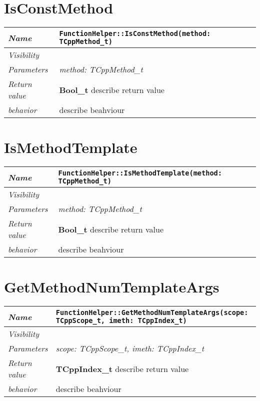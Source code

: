  \section{IsConstMethod}
\begin{longtable}{p{3cm} @{\hskip 1cm} p{12cm}}
 \hline
\textit{Name} & \texttt{FunctionHelper::IsConstMethod(method: TCppMethod_t)}\\
\hline
 \textit{Visibility} & \\
\hline
\textit{Parameters} & \textit{method: TCppMethod_t}\\
\hline
\textit{Return value} & \textbf{ Bool_t} describe return value\\
  \hline
 \textit{behavior} & describe beahviour \\
\hline
\end{longtable} \pagebreak
 \section{IsMethodTemplate}
\begin{longtable}{p{3cm} @{\hskip 1cm} p{12cm}}
 \hline
\textit{Name} & \texttt{FunctionHelper::IsMethodTemplate(method: TCppMethod_t)}\\
\hline
 \textit{Visibility} & \\
\hline
\textit{Parameters} & \textit{method: TCppMethod_t}\\
\hline
\textit{Return value} & \textbf{ Bool_t} describe return value\\
  \hline
 \textit{behavior} & describe beahviour \\
\hline
\end{longtable} \pagebreak
 \section{GetMethodNumTemplateArgs}
\begin{longtable}{p{3cm} @{\hskip 1cm} p{12cm}}
 \hline
\textit{Name} & \texttt{FunctionHelper::GetMethodNumTemplateArgs(scope: TCppScope_t, imeth: TCppIndex_t)}\\
\hline
 \textit{Visibility} & \\
\hline
\textit{Parameters} & \textit{scope: TCppScope_t, imeth: TCppIndex_t}\\
\hline
\textit{Return value} & \textbf{ TCppIndex_t} describe return value\\
  \hline
 \textit{behavior} & describe beahviour \\
\hline
\end{longtable} \pagebreak
